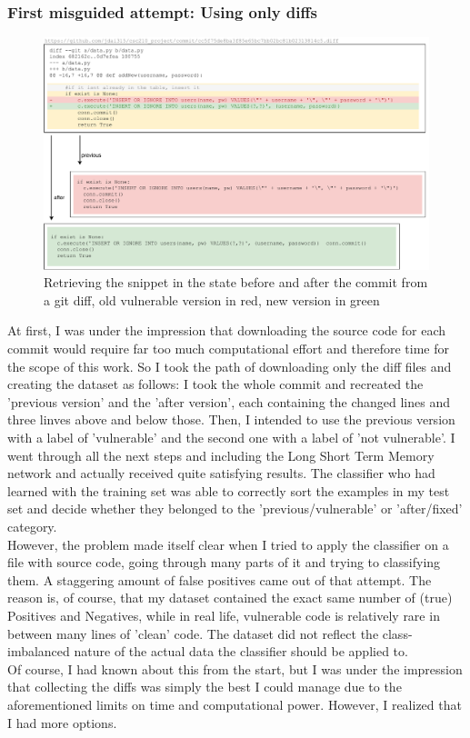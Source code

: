 \documentclass[
	a4paper,
	pagesize,
	pdftex,
	12pt,
	twoside, %
	BCOR=5mm, %
	ngerman,
	fleqn,
	final,
	]{scrartcl}
\begin{document}
\subsubsection{First misguided attempt: Using only diffs}

\begin{figure}[ht]
	\centering
	\includegraphics[width=\linewidth]{img/GitCommitPreviousAfter}
	\caption{Retrieving the snippet in the state before and after the commit from a git diff, old vulnerable version in red, new version in green}
	\label{fig:gitdiff}
\end{figure}

At first, I was under the impression that downloading the source code for each commit would require far too much computational effort and therefore time for the scope of this work. So I took the path of downloading only the diff files and creating the dataset as follows: I took the whole commit and recreated the 'previous version' and the 'after version', each containing the changed lines and three linves above and below those. Then, I intended to use the previous version with a label of 'vulnerable' and the second one with a label of 'not vulnerable'. I went through all the next steps and including the Long Short Term Memory network and actually received quite satisfying results. The classifier who had learned with the training set was able to correctly sort the examples in my test set and decide whether they belonged to the 'previous/vulnerable' or 'after/fixed' category.\\
However, the problem made itself clear when I tried to apply the classifier on a file with source code, going through many parts of it and trying to classifying them. A staggering amount of false positives came out of that attempt. The reason is, of course, that my dataset contained the exact same number of (true) Positives and Negatives, while in real life, vulnerable code is relatively rare in between many lines of 'clean' code. The dataset did not reflect the class-imbalanced nature of the actual data the classifier should be applied to.\\
Of course, I had known about this from the start, but I was under the impression that collecting the diffs was simply the best I could manage due to the aforementioned limits on time and computational power. However, I realized that I had more options.
\end{document}
